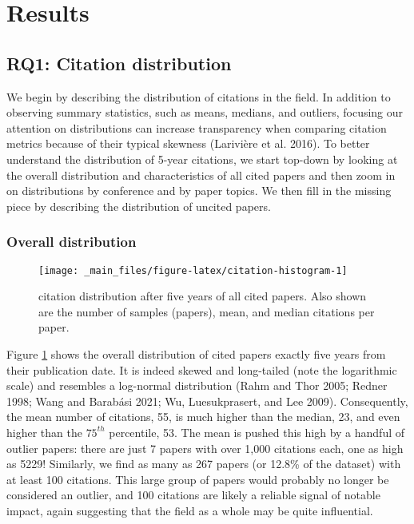 \documentclass{article}
\begin{document}
\hypertarget{sec:results}{%
\section{Results}\label{sec:results}}

\hypertarget{rq1-citation-distribution}{%
\subsection{RQ1: Citation distribution}\label{rq1-citation-distribution}}

We begin by describing the distribution of citations in the field.
In addition to observing summary statistics, such as means, medians, and outliers, focusing our attention on distributions can increase transparency when comparing citation metrics because of their typical skewness (Larivière et al. 2016).
To better understand the distribution of 5-year citations, we start top-down by looking at the overall distribution and characteristics of all cited papers and then zoom in on distributions by conference and by paper topics.
We then fill in the missing piece by describing the distribution of uncited papers.

\hypertarget{overall-distribution}{%
\subsubsection{Overall distribution}\label{overall-distribution}}

\begin{figure}
\texttt{[image: \_main\_files/figure-latex/citation-histogram-1]} \caption{citation distribution after five years of all cited papers. Also shown are the number of samples (papers), mean, and median citations per paper.}\label{fig:citation-histogram}
\end{figure}

Figure \ref{fig:citation-histogram} shows the overall distribution of cited papers exactly five years from their publication date.
It is indeed skewed and long-tailed (note the logarithmic scale) and resembles a log-normal distribution (Rahm and Thor 2005; Redner 1998; Wang and Barabási 2021; Wu, Luesukprasert, and Lee 2009).
Consequently, the mean number of citations, 55, is much higher than the median,
23, and even higher than the \(75^{th}\) percentile, 53.
The mean is pushed this high by a handful of outlier papers: there are just 7 papers with over 1,000 citations each, one as high as 5229!
Similarly, we find as many as 267 papers (or
12.8\% of the dataset) with at least 100 citations.
This large group of papers would probably no longer be considered an outlier, and 100 citations are likely a reliable signal of notable impact, again suggesting that the field as a whole may be quite influential.
\end{document}
